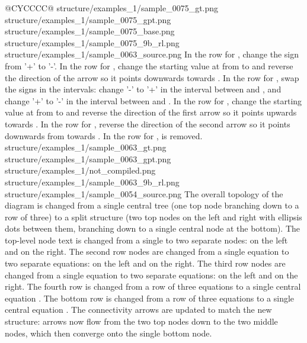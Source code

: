 \begin{table}[t]
\begin{tabularx}{\textwidth}{@{}CYCCCC@{}}
      {structure/examples_1/sample_0075_gt.png}
      {structure/examples_1/sample_0075_gpt.png}
      {structure/examples_1/sample_0075_base.png}
      {structure/examples_1/sample_0075_9b_rl.png}
    \midrule
    \exrowonesix
      {structure/examples_1/sample_0063_source.png}
      {In the row for , change the sign from '+' to '-'. In the row for , change the starting value at \smath{-\infty} from \smath{-\infty} to \smath{+\infty} and reverse the direction of the arrow so it points downwards towards . In the row for , swap the signs in the intervals: change '-' to '+' in the interval between \smath{-\infty} and , and change '+' to '-' in the interval between  and \smath{+\infty}. In the row for , change the starting value at \smath{-\infty} from \smath{+\infty} to \smath{-\infty} and reverse the direction of the first arrow so it points upwards towards . In the row for , reverse the direction of the second arrow so it points downwards from  towards . In the row for , is removed.}
      {structure/examples_1/sample_0063_gt.png}
      {structure/examples_1/sample_0063_gpt.png}
      {structure/examples_1/not_compiled.png}
      {structure/examples_1/sample_0063_9b_rl.png}
    \midrule
    \exrowoneseven
      {structure/examples_1/sample_0054_source.png}
      {The overall topology of the diagram is changed from a single central tree (one top node branching down to a row of three) to a split structure (two top nodes on the left and right with ellipsis dots between them, branching down to a single central node at the bottom). The top-level node text is changed from a single  to two separate nodes:  on the left and  on the right. The second row nodes are changed from a single  equation to two separate equations:  on the left and  on the right. The third row nodes are changed from a single  equation to two separate equations:  on the left and  on the right. The fourth row is changed from a row of three \smathsmall{\mu} equations to a single central equation . The bottom row is changed from a row of three  equations to a single central equation . The connectivity arrows are updated to match the new structure: arrows now flow from the two top nodes down to the two middle nodes, which then converge onto the single bottom node.}

\end{tabularx}
\end{table}
